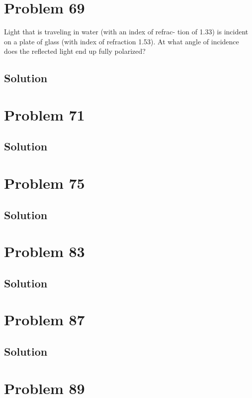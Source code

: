 \documentclass[12pt]{article}
\begin{document}
    \pagebreak
    \section{Problem 69}
        Light that is traveling in water (with an index of refrac-
tion of 1.33) is incident on a plate of glass (with index of refraction
1.53). At what angle of incidence does the reflected light end up
fully polarized?

        \subsection{Solution}

    \pagebreak
    \section{Problem 71}

        \subsection{Solution}

    \pagebreak
    \section{Problem 75}

        \subsection{Solution}

    \pagebreak
    \section{Problem 83}

        \subsection{Solution}

    \pagebreak
    \section{Problem 87}

        \subsection{Solution}

    \pagebreak
    \section{Problem 89}
\end{document}
